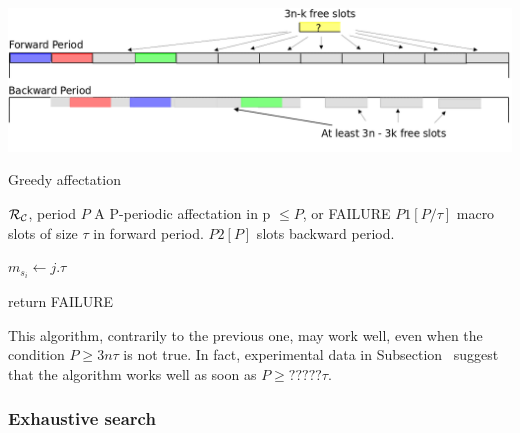 \documentclass[a4paper,10pt]{article}
\begin{document}
      \begin{center}
      \includegraphics[scale=0.3]{ex3nt.png}
      \end{center}
	\begin{algorithm}[H]
	\caption{Greedy affectation}
	\begin{algorithmic}
	\REQUIRE ${\cal R}_{\cal C}$, period $P$
	\ENSURE A P-periodic affectation in p $\leq P$, or FAILURE
	\STATE $P1[P/\tau]$ macro slots of size $\tau$ in forward period.
	\STATE $P2[P]$ slots backward period.



	
	\STATE $m_{s_i} \leftarrow j.\tau$
	\ENDIF


	\STATE return FAILURE
	\ENDIF
	\ENDFOR

	\ENDFOR

	\end{algorithmic}
	\end{algorithm}
	
This algorithm, contrarily to the previous one, may work well, even when the condition $P \geq 3n\tau$ is not true.
In fact, experimental data in Subsection~\cite{} suggest that the algorithm works well as soon as $P \geq ????? \tau$.
	
	\subsubsection{Exhaustive search}
% 
% 
\end{document}
